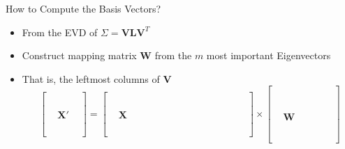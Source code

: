 \documentclass[aspectratio=169]{beamer}
\begin{document}
\begin{frame}{How to Compute the Basis Vectors?}

\begin{itemize}

\item From the EVD of $\Sigma =  \textbf{V}\textbf{L}\textbf{V}^T$
\item Construct mapping matrix $\textbf{W}$ from the $m$ most important Eigenvectors
 \item That is, the leftmost columns of $\textbf{V}$ 
 \[
\begin{bmatrix} 
	 &   & 	\\
	 &   & 	\\
	 &   & 	\\
	 &   & 	\\
	 & \textbf{X}' & 	\\
	 &  & 	\\
	 &  & 	\\
	 & & 	\\
\end{bmatrix} 
= \begin{bmatrix} 
	&\hspace{12em}  & 	\\
	&  & 	\\
	&  & 	\\
	&  & 	\\
	&\textbf{X} & 	\\
	&  & 	\\
	&  & 	\\
	&  & 	\\
\end{bmatrix} 
\times
 \begin{bmatrix} 
	 &  \hspace{4em}& 	\\
	&  & 	\\
	  &  &\\
	  &  &\\
	  &  &\\
	  &  &\\
	  & \textbf{W} &\\
	  &  &\\
	  &  &\\
	  &  &\\
	  &  &\\
	  &  & 
\end{bmatrix} 
\]

\end{itemize}
\end{frame}
\end{document}

